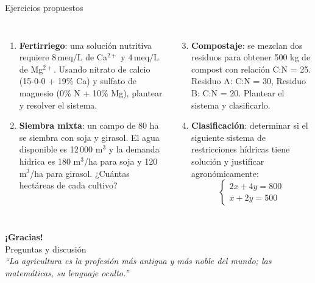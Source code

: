 \documentclass[11pt, aspectratio=169]{beamer}
\begin{document}
	\begin{frame}{Ejercicios propuestos}
		\small
		\begin{columns}[T]
			\begin{enumerate}
				\item \textbf{Fertirriego}: una solución nutritiva requiere
				$8\,\text{meq/L}$ de Ca$^{2+}$ y $4\,\text{meq/L}$ de Mg$^{2+}$.
				Usando nitrato de calcio (15-0-0 + 19\% Ca) y sulfato de magnesio
				(0\% N + 10\% Mg), plantear y resolver el sistema.
				
				\vspace{0.6em}
				\item \textbf{Siembra mixta}: un campo de 80 ha se siembra con soja
				y girasol. El agua disponible es 12\,000 m$^3$ y la demanda
				hídrica es 180 m$^3$/ha para soja y 120 m$^3$/ha para girasol.
				¿Cuántas hectáreas de cada cultivo?
			\end{enumerate}
			
			\begin{enumerate}
				\setcounter{enumi}{2}
				\item \textbf{Compostaje}: se mezclan dos residuos para obtener
				500 kg de compost con relación C:N = 25.
				Residuo A: C:N = 30, Residuo B: C:N = 20.
				Plantear el sistema y clasificarlo.
				
				\vspace{0.6em}
				\item \textbf{Clasificación}: determinar si el siguiente sistema
				de restricciones hídricas tiene solución y justificar
				agronómicamente:
				\[
				\left\{\begin{array}{l}
					2x + 4y = 800 \\
					x + 2y = 500
				\end{array}\right.
				\]
			\end{enumerate}
		\end{columns}
	\end{frame}
	
	\begin{frame}[plain]
		\begin{center}
			{\Large\color{verdecampo}\textbf{¡Gracias!}}\\[1em]
			{\normalsize Preguntas y discusión}\\[2em]
			\textit{``La agricultura es la profesión más antigua y más noble del mundo;
				las matemáticas, su lenguaje oculto.''}\\[1.5em]
		\end{center}
	\end{frame}
	
\end{document}
